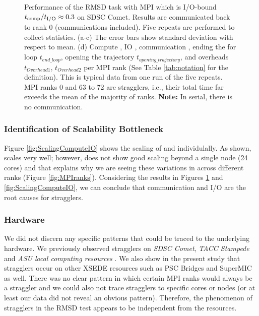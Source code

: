\begin{figure}
\caption{Performance of the RMSD task with MPI which is I/O-bound ${t}_{\text{comp}}/{t}_{\text{I/O}} \approx 0.3$ on SDSC Comet.
Results are communicated back to rank 0 (communications included). Five repeats are performed to collect statistics. (a-c) The error bars show
standard deviation with respect to mean. (d) Compute \tcomp, IO \tIO, communication \tcomm, ending the for loop $t_{end\_loop}$,
opening the trajectory $t_{opening\_trajectory}$, and overheads $t_{Overhead1}$,  $t_{Overhead2}$ per MPI rank (See Table \ref{tab:notation} for the definition).
This is typical data from one run of the five repeats. MPI ranks 0 and 63 to 72 are stragglers, i.e., their total time 
far exceeds the mean of the majority of ranks. \textbf{Note:} In serial, there is no communication.}
\label{fig:MPIwithIO}
\end{figure} 

\subsubsection*{Identification of Scalability Bottleneck}

Figure \ref{fig:ScalingComputeIO} shows the scaling of \tcomp and \tIO individulally. 
As shown, \tcomp scales very well; however, \tIO does not show good scaling beyond a single node (24 cores) and that explains why we are seeing these variations in \tIO across different ranks (Figure \ref{fig:MPIranks}). 
Considering the results in Figures \ref{fig:MPIwithIO} and \ref{fig:ScalingComputeIO}, we can conclude that communication and I/O are the root causes for stragglers. 

\subsubsection*{Hardware}
We did not discern any specific patterns that could be traced to the underlying hardware. 
We previously observed stragglers on \emph{SDSC Comet}, \emph{TACC Stampede} and \emph{ASU local computing resources} \cite{Khoshlessan:2017ab}. 
We also show in the present study that stragglers occur on other XSEDE resources such as PSC Bridges and SuperMIC as well.
There was no clear pattern in which certain MPI ranks would always be a straggler and we could also not trace stragglers to specific cores or nodes (or at least our data did not reveal an obvious pattern). 
Therefore, the phenomenon of stragglers in the RMSD test appears to be independent from the resources.

